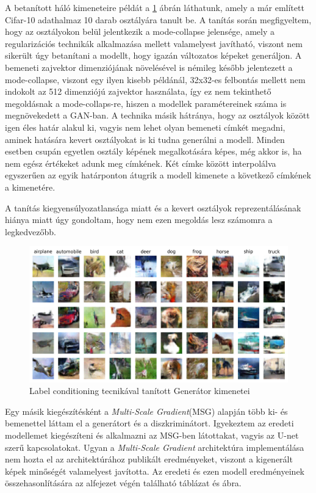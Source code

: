 A betanított háló kimeneteire példát a \ref{fig:labelconditioning} ábrán láthatunk, amely a már említett Cifar-10 adathalmaz 10 darab osztályára tanult be. A tanítás során megfigyeltem, hogy az osztályokon belül jelentkezik a mode-collapse jelensége, amely a regularizációs technikák alkalmazása mellett valamelyest javítható, viszont nem sikerült úgy betanítani a modellt, hogy igazán változatos képeket generáljon. A bemeneti zajvektor dimenziójának növelésével is némileg később jelentezett a mode-collapse, viszont egy ilyen kisebb példánál, 32x32-es felbontás mellett nem indokolt az 512 dimenziójú zajvektor használata, így ez nem tekinthető megoldásnak a mode-collaps-re, hiszen a modellek paramétereinek száma is megnövekedett a GAN-ban.
A technika másik hátránya, hogy az osztályok között igen éles határ alakul ki, vagyis nem lehet olyan bemeneti címkét megadni, aminek hatására kevert osztályokat is ki tudna generálni a modell. Minden esetben csupán egyetlen osztály képének megalkotására képes, még akkor is, ha nem egész értékeket adunk meg címkének. Két címke között interpolálva egyszerűen az egyik határponton átugrik a modell kimenete a következő címkének a kimenetére.

A tanítás kiegyensúlyozatlansága miatt és a kevert osztályok reprezentálásának hiánya miatt úgy gondoltam, hogy nem ezen megoldás lesz számomra a legkedvezőbb.

\begin{figure}[h]
	\centering
	\includegraphics[width=13cm]{images/label_conditioning.png}
	\caption{Label conditioning tecnikával tanított Generátor kimenetei}
	\label{fig:labelconditioning}
\end{figure}


Egy másik kiegészítésként a \textit{Multi-Scale Gradient}(MSG) \cite{karnewar2020msg} alapján több ki- és bemenettel láttam el a generátort és a diszkriminátort. Igyekeztem az eredeti modellemet kiegészíteni és alkalmazni az MSG-ben látottakat, vagyis az U-net szerű kapcsolatokat. Ugyan a \textit{Multi-Scale Gradient} architektúra implementálása nem hozta el az architektúrához publikált eredményeket, viszont a kigenerált képek minőségét valamelyest javította. Az eredeti és ezen modell eredményeinek összehasonlítására az alfejezet végén található táblázat és ábra.

